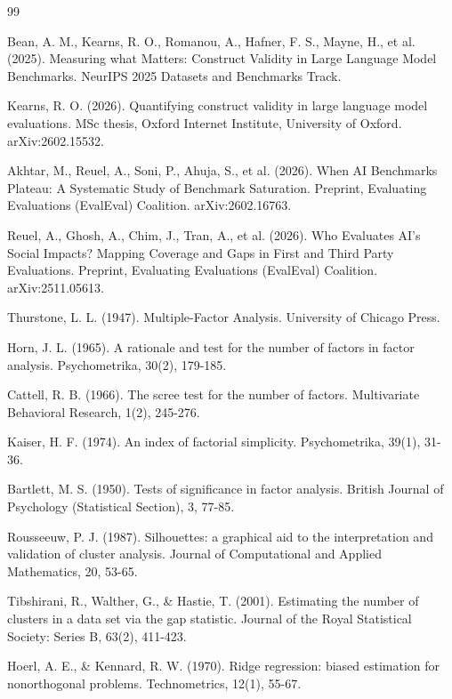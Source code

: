 \begin{thebibliography}{99}

 Bean, A. M., Kearns, R. O., Romanou, A., Hafner, F. S., Mayne, H., et al. (2025). Measuring what Matters: Construct Validity in Large Language Model Benchmarks. NeurIPS 2025 Datasets and Benchmarks Track.

 Kearns, R. O. (2026). Quantifying construct validity in large language model evaluations. MSc thesis, Oxford Internet Institute, University of Oxford. arXiv:2602.15532.

 Akhtar, M., Reuel, A., Soni, P., Ahuja, S., et al. (2026). When AI Benchmarks Plateau: A Systematic Study of Benchmark Saturation. Preprint, Evaluating Evaluations (EvalEval) Coalition. arXiv:2602.16763.

 Reuel, A., Ghosh, A., Chim, J., Tran, A., et al. (2026). Who Evaluates AI's Social Impacts? Mapping Coverage and Gaps in First and Third Party Evaluations. Preprint, Evaluating Evaluations (EvalEval) Coalition. arXiv:2511.05613.

 Thurstone, L. L. (1947). Multiple-Factor Analysis. University of Chicago Press.

 Horn, J. L. (1965). A rationale and test for the number of factors in factor analysis. Psychometrika, 30(2), 179-185.

 Cattell, R. B. (1966). The scree test for the number of factors. Multivariate Behavioral Research, 1(2), 245-276.

 Kaiser, H. F. (1974). An index of factorial simplicity. Psychometrika, 39(1), 31-36.

 Bartlett, M. S. (1950). Tests of significance in factor analysis. British Journal of Psychology (Statistical Section), 3, 77-85.

 Rousseeuw, P. J. (1987). Silhouettes: a graphical aid to the interpretation and validation of cluster analysis. Journal of Computational and Applied Mathematics, 20, 53-65.

 Tibshirani, R., Walther, G., \& Hastie, T. (2001). Estimating the number of clusters in a data set via the gap statistic. Journal of the Royal Statistical Society: Series B, 63(2), 411-423.

 Hoerl, A. E., \& Kennard, R. W. (1970). Ridge regression: biased estimation for nonorthogonal problems. Technometrics, 12(1), 55-67.


\end{thebibliography}
